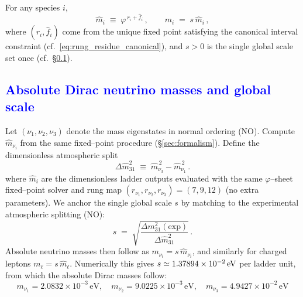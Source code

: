 \documentclass[%
 amsmath,amssymb,
 aps,
prb,
floatfix, showkeys
]{revtex4-2}
\newcommand{\modif}[1]{\textcolor{blue}{#1}}
\begin{document}
For any species $i$,
\begin{equation}
  \widehat m_i \;\equiv\; \varphi^{\,r_i+\widehat f_i}\,,\qquad
  m_i \;=\; s\,\widehat m_i\,,
  \label{eq:ladder_output_and_scale}
\end{equation}
where $(r_i,\widehat f_i)$ come from the unique fixed point satisfying the canonical interval constraint (cf.\ \eqref{eq:rung_residue_canonical}), and $s>0$ is the single global scale set once (cf.\ \S\ref{subsec:nu-absolute}).


{\modif{
\subsection{Absolute Dirac neutrino masses and global scale}
\label{subsec:nu-absolute}
}}
Let $(\nu_1,\nu_2,\nu_3)$ denote the mass eigenstates in normal ordering (NO).
Compute $\widehat m_{\nu_i}$ from the same fixed--point procedure (\S\ref{sec:formalism}).
Define the dimensionless atmospheric split
\begin{equation}
  \Delta \widehat m^2_{31} \;\equiv\; \widehat m_{\nu_3}^{\,2} - \widehat m_{\nu_1}^{\,2}\,.
  \label{eq:dimless_atmo}
\end{equation}
where $\widehat m_i$ are the dimensionless ladder outputs evaluated with the same
$\varphi$--sheet fixed--point solver and rung map $(r_{\nu_1},r_{\nu_2},r_{\nu_3})=(7,9,12)$ (no extra parameters).
We anchor the single global scale $s$ by matching to the experimental atmospheric splitting (NO):
\begin{equation}
  s \;=\; \sqrt{\frac{\Delta m^2_{31}(\mathrm{exp})}{\Delta \widehat m^2_{31}}}\,.
  \label{eq:nu_global_scale}
\end{equation}
Absolute neutrino masses then follow as $m_{\nu_i}=s\,\widehat m_{\nu_i}$, and
similarly for charged leptons $m_\ell=s\,\widehat m_\ell$.
 Numerically this gives
$s \simeq 1.37894\times10^{-2}\,{\rm eV}$ per ladder unit, from which the absolute Dirac masses follow:
\[
m_{\nu_1}=2.0832\times10^{-3}\,\text{eV},\quad
m_{\nu_2}=9.0225\times10^{-3}\,\text{eV},\quad
m_{\nu_3}=4.9427\times10^{-2}\,\text{eV}
\]
\end{document}
